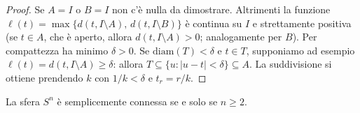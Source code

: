\begin{proof}
Se $A = I$ o $B = I$ non c'\`e nulla da dimostrare. Altrimenti la funzione $\ell(t) = \max\{ d(t, I \setminus A),\, d(t, I \setminus B) \}$ \`e continua su $I$ e strettamente positiva (se $t \in A$, che \`e aperto, allora $d(t, I\setminus A) > 0$; analogamente per $B$). Per compattezza ha minimo $\delta > 0$. Se $\mathrm{diam}(T) < \delta$ e $t \in T$, supponiamo ad esempio $\ell(t) = d(t, I \setminus A) \geqslant \delta$: allora $T \subseteq \{u : |u - t| < \delta\} \subseteq A$. La suddivisione si ottiene prendendo $k$ con $1/k < \delta$ e $t_r = r/k$.
\end{proof}

\begin{teo}
La sfera $S^n$ è semplicemente connessa se e solo se $n \geqslant 2$.
\end{teo}


